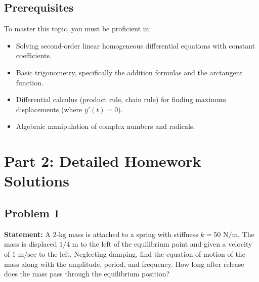 \documentclass[11pt]{article}
\begin{document}
\subsection{Prerequisites}
To master this topic, you must be proficient in:
\begin{itemize}
    \item Solving second-order linear homogeneous differential equations with constant coefficients.
    \item Basic trigonometry, specifically the addition formulas and the arctangent function.
    \item Differential calculus (product rule, chain rule) for finding maximum displacements (where $y'(t) = 0$).
    \item Algebraic manipulation of complex numbers and radicals.
\end{itemize}

\newpage
\section{Part 2: Detailed Homework Solutions}

\subsection{Problem 1}
\textbf{Statement:} A $2\text{-kg}$ mass is attached to a spring with stiffness $k = 50 \text{ N/m}$. The mass is displaced $1/4 \text{ m}$ to the left of the equilibrium point and given a velocity of $1 \text{ m/sec}$ to the left. Neglecting damping, find the equation of motion of the mass along with the amplitude, period, and frequency. How long after release does the mass pass through the equilibrium position?
\end{document}
